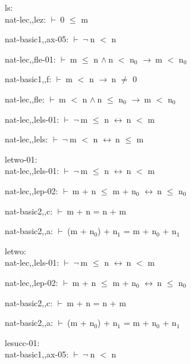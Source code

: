 \documentclass[a4paper]{article}
\newcommand{\Fol}{\mbox{$\vdash\ $}}
\newcommand{\Not}{\mbox{$\neg\ $}}
\newcommand{\And}{\mbox{$\wedge\ $}}
\newcommand{\Imp}{\mbox{$\rightarrow\ $}}
\newcommand{\Equiv}{\mbox{$\leftrightarrow\ $}}
\begin{document}
\bigskip

ls:\\ nat-lec,,lez: 
 \Fol 0 $\le$ m



nat-basic1,,ax-05: 
 \Fol \Not n $<$ n



nat-lec,,fle-01: 
 \Fol m $\le$ n \And n $<$ $\mbox{n}_{0}$ \Imp m $<$ $\mbox{n}_{0}$



nat-basic1,,f: 
 \Fol m $<$ n \Imp n $\neq$ 0



nat-lec,,fle: 
 \Fol m $<$ n \And n $\le$ $\mbox{n}_{0}$ \Imp m $<$ $\mbox{n}_{0}$



nat-lec,,lels-01: 
 \Fol \Not m $\le$ n \Equiv n $<$ m



nat-lec,,lels: 
 \Fol \Not m $<$ n \Equiv n $\le$ m



\bigskip

letwo-01:\\ nat-lec,,lels-01: 
 \Fol \Not m $\le$ n \Equiv n $<$ m



nat-lec,,lep-02: 
 \Fol m + n $\le$ m + $\mbox{n}_{0}$ \Equiv n $\le$ $\mbox{n}_{0}$



nat-basic2,,c: 
 \Fol m + n = n + m



nat-basic2,,a: 
 \Fol (m + $\mbox{n}_{0}$) + $\mbox{n}_{1}$ = m + $\mbox{n}_{0}$ + $\mbox{n}_{1}$



\bigskip

letwo:\\ nat-lec,,lels-01: 
 \Fol \Not m $\le$ n \Equiv n $<$ m



nat-lec,,lep-02: 
 \Fol m + n $\le$ m + $\mbox{n}_{0}$ \Equiv n $\le$ $\mbox{n}_{0}$



nat-basic2,,c: 
 \Fol m + n = n + m



nat-basic2,,a: 
 \Fol (m + $\mbox{n}_{0}$) + $\mbox{n}_{1}$ = m + $\mbox{n}_{0}$ + $\mbox{n}_{1}$



\bigskip

lesucc-01:\\ nat-basic1,,ax-05: 
 \Fol \Not n $<$ n
\end{document}
